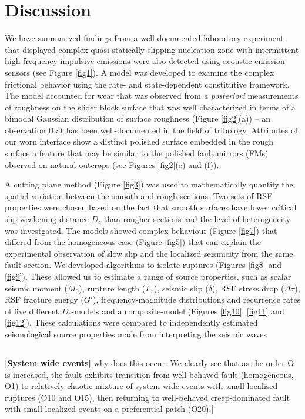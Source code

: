 \documentclass[preprint,1p, 10pt,authoryear]{elsarticle}
\begin{document}
\section{Discussion}
We have summarized findings from a well-documented laboratory experiment \citep{Selvadurai2015, Selvadurai2017, Selvadurai2019} that displayed complex quasi-statically slipping nucleation zone with intermittent high-frequency impulsive emissions were also detected using acoustic emission sensors (see Figure \ref{fig1}). A model was developed to examine the complex frictional behavior using the rate- and state-dependent constitutive framework. The model accounted for wear that was observed from \textit{a posteriori} measurements of roughness on the slider block surface that was well characterized in terms of a bimodal Gaussian distribution of surface roughness (Figure \ref{fig2}(a)) -- an observation that has been well-documented in the field of tribology. Attributes of our worn interface show a distinct polished surface embedded in the rough surface a feature that may be similar to the polished fault mirrors (FMs) observed on natural outcrops (see Figures \ref{fig2}(e) and (f)).

 A cutting plane method (Figure \ref{fig3}) was used to mathematically quantify the spatial variation between the smooth and rough sections. Two sets of RSF properties were chosen based on the fact that smooth surfaces have lower critical slip weakening distance $D_{c}$ than rougher sections and the level of heterogeneity was investgated. The models showed complex behaviour (Figure \ref{fig7}) that differed from the homogeneous case (Figure \ref{fig5}) that can explain the experimental observation of slow slip and the localized seismicity from the same fault section.  We developed algorithms to isolate ruptures (Figures \ref{fig8} and \ref{fig9}).  These allowed us to estimate a range of source properties, such as scalar seismic moment ($M_{0}$), rupture length ($L_{r}$), seismic slip ($\delta$), RSF stress drop ($\Delta\tau$), RSF fracture energy ($G'$), frequency-magnitude distributions and recurrence rates of five different $D_{c}$-models and a composite-model (Figures \ref{fig10}, \ref{fig11} and \ref{fig12}). These calculations were compared to independently estimated seismological source properties made from interpreting the seismic waves \citep{Selvadurai2019}


\subsection{}
\textbf{[System wide events]}
why does this occur: We clearly see that as the order O is increased, the fault exhibits transition from well-behaved fault (homogeneous, O1) to relatively chaotic mixture of system wide events with small localised ruptures (O10 and O15), then returning to well-behaved creep-dominated fault with small localized events on a preferential patch (O20).]
\end{document}
